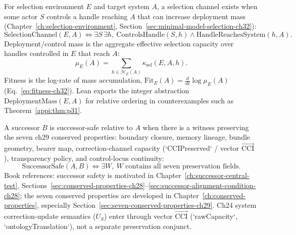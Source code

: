 \begin{definition}
\label{appi:def:spine-selection-channel}
For selection environment \(E\) and target system \(A\), a selection channel exists when some actor \(S\) controls a handle reaching \(A\) that can increase deployment mass (Chapter~\ref{ch:selection-environment}, Section~\ref{sec:minimal-model-selection-ch32}):
\begin{equation}
\label{appi:eq:selection-channel}
\mathrm{SelectionChannel}(E,A)
\iff
\exists S\,\exists h,\ \mathrm{ControlsHandle}(S,h)\wedge \mathrm{HandleReachesSystem}(h,A).
\end{equation}
Deployment/control mass is the aggregate effective selection capacity over handles controlled in \(E\) that reach \(A\):
\begin{equation}
\label{appi:eq:deployment-mass}
\mu_E(A)=\sum_{h\in\mathcal{H}_E(A)}\kappa_{\mathrm{sel}}(E,A,h).
\end{equation}
Fitness is the log-rate of mass accumulation, \(\mathrm{Fit}_E(A)=\frac{d}{dt}\log\mu_E(A)\) (Eq.~\eqref{eq:fitness-ch32}).
Lean exports the integer abstraction \(\mathrm{DeploymentMass}(E,A)\) for relative ordering in counterexamples such as Theorem~\ref{appi:thm:p31}.
\end{definition}

\begin{definition}
\label{appi:def:spine-successor-safe}
A successor \(B\) is successor-safe relative to \(A\) when there is a witness preserving the seven ch29 conserved properties: boundary closure, memory lineage, bundle geometry, bearer map, correction-channel capacity (`CCIPreserved` / vector \(\vec{\mathrm{CCI}}\)), transparency policy, and control-locus continuity:
\begin{equation}
\label{appi:eq:successor-safe}
\mathrm{SuccessorSafe}(A,B)\iff \exists W,\ W\text{ contains all seven preservation fields.}
\end{equation}
Book references: successor safety is motivated in Chapter~\ref{ch:successor-central-test}, Sections~\ref{sec:conserved-properties-ch28}--\ref{sec:successor-alignment-condition-ch28}; the seven conserved properties are developed in Chapter~\ref{ch:conserved-properties}, especially Section~\ref{sec:seven-conserved-properties-ch29}.
Ch24 system correction-update semantics (\(U_S\)) enter through vector \(\vec{\mathrm{CCI}}\) (`rawCapacity`, `ontologyTranslation`), not a separate preservation conjunct.
\end{definition}

